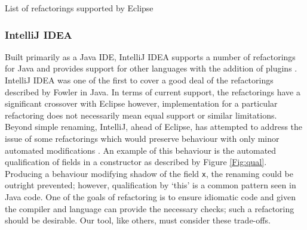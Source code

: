 
\begin{center}
\begin{fig}
\caption{List of refactorings supported by Eclipse}
\label{Fig:eclipse}
\end{fig}
\end{center}

\subsubsection{IntelliJ IDEA}
Built primarily as a Java IDE, IntelliJ IDEA supports a number of refactorings for Java and provides support for other languages with the addition of plugins \cite{jetbrains15}. IntelliJ IDEA was one of the first to cover a good deal of the refactorings described by Fowler in Java. In terms of current support, the refactorings have a significant crossover with Eclipse however, implementation for a particular refactoring does not necessarily mean equal support or similar limitations. Beyond simple renaming, IntelliJ, ahead of Eclipse, has attempted to address the issue of some refactorings which would preserve behaviour with only minor automated modifications \cite{schafer2010specification}. An example of this behaviour is the automated qualification of fields in a constructor as described by Figure \ref{Fig:qual}. Producing a behaviour modifying shadow of the field {\verb|x|}, the renaming could be outright prevented; however, qualification by `this' is a common pattern seen in Java code. One of the goals of refactoring is to ensure idiomatic code and given the compiler and language can provide the necessary checks; such a refactoring should be desirable. Our tool, like others, must consider these trade-offs.

